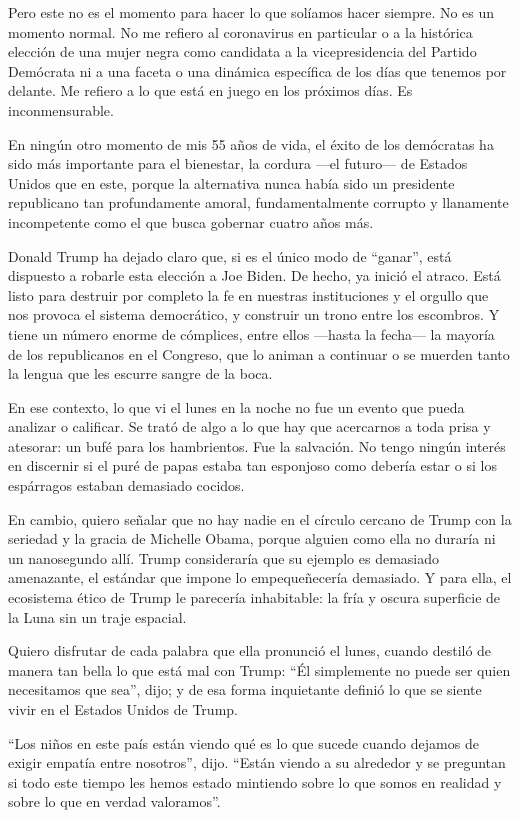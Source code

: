 Pero este no es el momento para hacer lo que solíamos hacer siempre. No
es un momento normal. No me refiero al coronavirus en particular o a la
histórica elección de una mujer negra como candidata a la
vicepresidencia del Partido Demócrata ni a una faceta o una dinámica
específica de los días que tenemos por delante. Me refiero a lo que está
en juego en los próximos días. Es inconmensurable.

En ningún otro momento de mis 55 años de vida, el éxito de los
demócratas ha sido más importante para el bienestar, la cordura ---el
futuro--- de Estados Unidos que en este, porque la alternativa nunca
había sido un presidente republicano tan profundamente amoral,
fundamentalmente corrupto y llanamente incompetente como el que busca
gobernar cuatro años más.

Donald Trump ha dejado claro que, si es el único modo de ``ganar'', está
dispuesto a robarle esta elección a Joe Biden. De hecho, ya inició el
atraco. Está listo para destruir por completo la fe en nuestras
instituciones y el orgullo que nos provoca el sistema democrático, y
construir un trono entre los escombros. Y tiene un número enorme de
cómplices, entre ellos ---hasta la fecha--- la mayoría de los
republicanos en el Congreso, que lo animan a continuar o se muerden
tanto la lengua que les escurre sangre de la boca.

En ese contexto, lo que vi el lunes en la noche no fue un evento que
pueda analizar o calificar. Se trató de algo a lo que hay que acercarnos
a toda prisa y atesorar: un bufé para los hambrientos. Fue la salvación.
No tengo ningún interés en discernir si el puré de papas estaba tan
esponjoso como debería estar o si los espárragos estaban demasiado
cocidos.

En cambio, quiero señalar que no hay nadie en el círculo cercano de
Trump con la seriedad y la gracia de Michelle Obama, porque alguien como
ella no duraría ni un nanosegundo allí. Trump consideraría que su
ejemplo es demasiado amenazante, el estándar que impone lo
empequeñecería demasiado. Y para ella, el ecosistema ético de Trump le
parecería inhabitable: la fría y oscura superficie de la Luna sin un
traje espacial.

Quiero disfrutar de cada palabra que ella pronunció el lunes, cuando
destiló de manera tan bella lo que está mal con Trump: ``Él simplemente
no puede ser quien necesitamos que sea'', dijo; y de esa forma
inquietante definió lo que se siente vivir en el Estados Unidos de
Trump.

``Los niños en este país están viendo qué es lo que sucede cuando
dejamos de exigir empatía entre nosotros'', dijo. ``Están viendo a su
alrededor y se preguntan si todo este tiempo les hemos estado mintiendo
sobre lo que somos en realidad y sobre lo que en verdad valoramos''.

